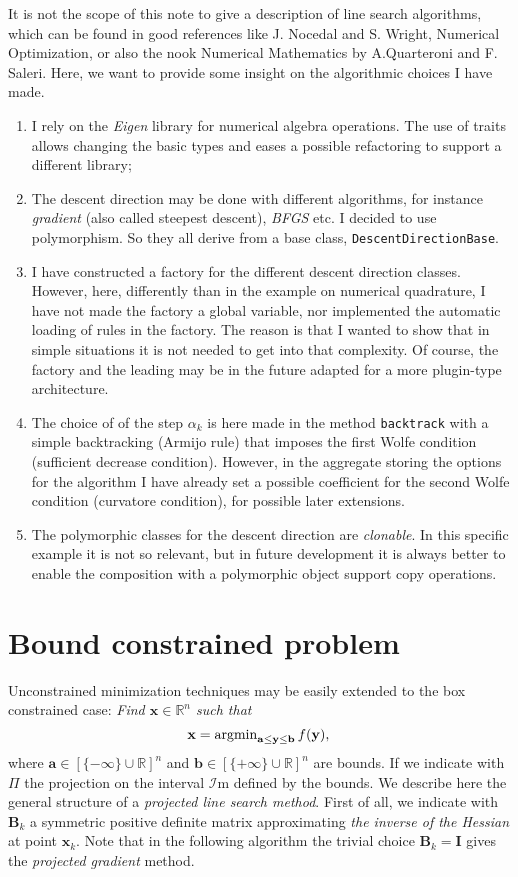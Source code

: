 \documentclass{article}
\newcommand{\li}{\lstinline}
\newcommand{\cpp}[1]{\li!#1!}
\begin{document}
It is not the scope of this note to give a description of line search algorithms, which can be found in good references like J. Nocedal and S. Wright, Numerical Optimization, or also the nook Numerical Mathematics by A.Quarteroni and F. Saleri.
Here, we want to provide some insight on the algorithmic choices I have made.
\begin{enumerate}
    \item I rely on the \emph{Eigen} library for numerical algebra operations. The use of traits allows changing the basic types and eases a possible refactoring to support a different library;
    \item The descent direction may be done with different algorithms, for instance \emph{gradient} (also called steepest descent), \emph{BFGS} etc. I decided to use polymorphism. So they all derive from a base class, \cpp{DescentDirectionBase}.
    \item I have constructed a factory for the different descent direction classes. However, here, differently than in the example on numerical quadrature, I have not made the factory a global variable, nor implemented the automatic loading of rules in the factory. The reason is that I wanted to show that in simple situations it is not needed to get into that complexity. Of course, the factory and the leading may be in the future adapted for a more plugin-type architecture.
    \item The choice of of the step $\alpha_k$ is here made in the method \cpp{backtrack} with a simple backtracking  (Armijo rule) that imposes the first Wolfe condition (sufficient decrease condition). However, in the aggregate storing the options for the algorithm I have already set a possible coefficient for the second Wolfe condition (curvatore condition), for possible later extensions.
    \item The polymorphic classes for the descent direction are \emph{clonable}. In this specific example it is not so relevant, but in future development it is always better to enable the composition with a polymorphic object support copy operations.  
\end{enumerate}
 
 \section{Bound constrained problem}
 Unconstrained minimization techniques may be easily extended to the box constrained case: 
 \emph{Find $\mathbf{x}\in \mathbb{R}^n$ such that}
 \[
 \mathbf{x}=\operatorname{argmin}_{ \mathbf{a}\le \mathbf{y}\le \mathbf{b}} f(\mathbf{y}),\\
 \]
 where $\mathbf{a}\in [\{-\infty\}\cup\mathbb{R}]^n$  and $\mathbf{b}\in [\{+\infty\}\cup\mathbb{R}]^n$ are bounds.
 If we indicate with $\Pi$ the projection on the interval $\mathcal{I}$m defined by the bounds.
 We describe here the general structure of a \emph{projected line search method}.
 First of all, we indicate with $\mathbf{B}_k$ a symmetric positive definite matrix
 approximating \emph{the inverse of the Hessian} at point $\mathbf{x}_k$. Note that in the following algorithm the trivial choice $\mathbf{B}_k=\mathbf{I}$ gives the \emph{projected gradient} method.
   
\end{document}
